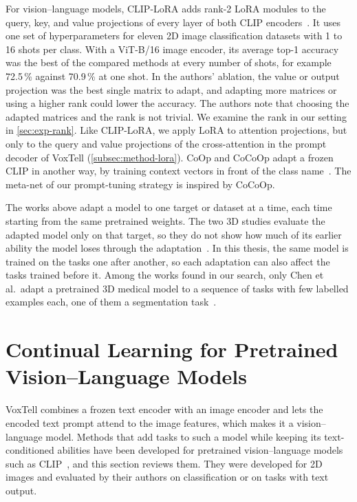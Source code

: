 For vision--language models, CLIP-LoRA adds rank-2 LoRA modules to the query, key, and value projections of every layer of both CLIP encoders~\cite{zanella2024lowrankfewshotadaptationvisionlanguage}.
It uses one set of hyperparameters for eleven 2D image classification datasets with 1 to 16 shots per class.
With a ViT-B/16 image encoder, its average top-1 accuracy was the best of the compared methods at every number of shots, for example 72.5\,\% against 70.9\,\% at one shot.
In the authors' ablation, the value or output projection was the best single matrix to adapt, and adapting more matrices or using a higher rank could lower the accuracy.
The authors note that choosing the adapted matrices and the rank is not trivial.
We examine the rank in our setting in \cref{sec:exp-rank}.
Like CLIP-LoRA, we apply LoRA to attention projections, but only to the query and value projections of the cross-attention in the prompt decoder of VoxTell (\cref{subsec:method-lora}).
CoOp and CoCoOp adapt a frozen CLIP in another way, by training context vectors in front of the class name~\cite{zhou2022coop,zhou2022cocoop}.
The meta-net of our prompt-tuning strategy is inspired by CoCoOp.

The works above adapt a model to one target or dataset at a time, each time starting from the same pretrained weights.
The two 3D studies evaluate the adapted model only on that target, so they do not show how much of its earlier ability the model loses through the adaptation~\cite{silvarodriguez2023fseft,ly2026seapeft}.
In this thesis, the same model is trained on the tasks one after another, so each adaptation can also affect the tasks trained before it.
Among the works found in our search, only Chen et al.\ adapt a pretrained 3D medical model to a sequence of tasks with few labelled examples each, one of them a segmentation task~\cite{chen2026fewshotcontinuallearning3d}.

\section[Continual Learning for Pretrained Vision--Language Models]{Continual Learning for Pretrained\texorpdfstring{\newline}{ } Vision--Language Models}
\label{sec:cl-vlm}

VoxTell combines a frozen text encoder with an image encoder and lets the encoded text prompt attend to the image features, which makes it a vision--language model.
Methods that add tasks to such a model while keeping its text-conditioned abilities have been developed for pretrained vision--language models such as CLIP~\cite{radford2021learningtransferablevisualmodels}, and this section reviews them.
They were developed for 2D images and evaluated by their authors on classification or on tasks with text output.

